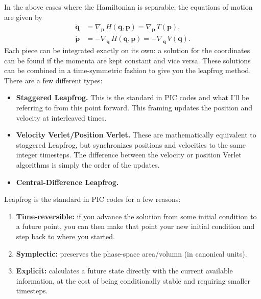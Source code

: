In the above cases where the Hamiltonian is separable, the equations of motion
are given by
\begin{align*}
    \dot{\mathbf{q}} &= \nabla_{\mathbf{p}} \, H(\mathbf{q}, \mathbf{p}) = \nabla_
    {\mathbf{p}} \, T(\mathbf{p}), \\
    \dot{\mathbf{p}} &= -\nabla_{\mathbf{q}} \, H(\mathbf{q}, \mathbf{p}) = -\nabla_
    {\mathbf{q}} \, V(\mathbf{q}). 
\end{align*}
Each piece can be integrated exactly on its own: a solution for the coordinates
can be found if the momenta are kept constant and vice versa. These solutions 
can be combined in a time-symmetric fashion to give you the leapfrog method. There
are a few different types:
\begin{itemize}

    \item \textbf{Staggered Leapfrog.} This is the standard in PIC codes and what
    I'll be referring to from this point forward. This framing updates the
    position and velocity at interleaved times.

    \item \textbf{Velocity Verlet/Position Verlet.} These are mathematically
    equivalent to staggered Leapfrog, but synchronizes positions and velocities
    to the same integer timesteps. The difference between the velocity or
    position Verlet algorithms is simply the order of the updates.

    \item \textbf{Central-Difference Leapfrog.}

\end{itemize}

Leapfrog is the standard in PIC codes for a few reasons:
\begin{enumerate}

    \item \textbf{Time-reversible:} if you advance the solution from some
    initial condition to a future point, you can then make that point your new
    initial condition and step back to where you started.

    \item \textbf{Symplectic:} preserves the phase-space area/volumn (in 
    canonical units).

    \item \textbf{Explicit:} calculates a future state directly with the 
    current available information, at the cost of being conditionally stable
    and requiring smaller timesteps.

\end{enumerate}


